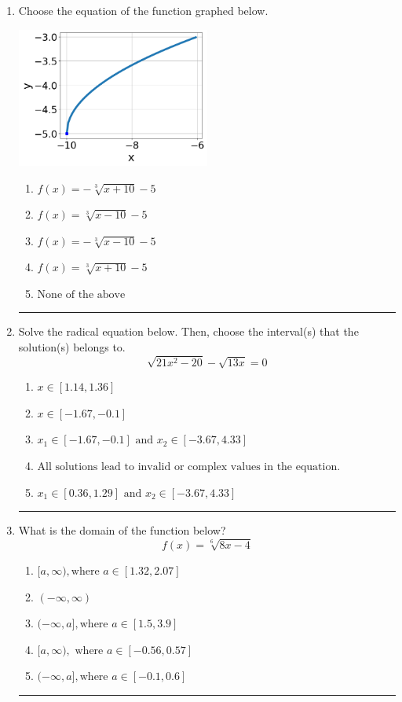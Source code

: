 \documentclass[14pt]{extbook}
\newcommand{\litem}[1]{\item#1\hspace*{-1cm}\rule{\textwidth}{0.4pt}}
\begin{document}
\begin{enumerate}
{\begin{enumerate}[label=\Alph*.]
\end{enumerate} }
\litem{
Choose the equation of the function graphed below.
\begin{center}
    \includegraphics[width=0.5\textwidth]{../Figures/radicalGraphToEquationCopyB.png}
\end{center}
\begin{enumerate}[label=\Alph*.]
\item \( f(x) = - \sqrt[3]{x + 10} - 5 \)
\item \( f(x) = \sqrt[3]{x - 10} - 5 \)
\item \( f(x) = - \sqrt[3]{x - 10} - 5 \)
\item \( f(x) = \sqrt[3]{x + 10} - 5 \)
\item \( \text{None of the above} \)

\end{enumerate} }
\litem{
Solve the radical equation below. Then, choose the interval(s) that the solution(s) belongs to.\[ \sqrt{21 x^2 - 20} - \sqrt{13 x} = 0 \]\begin{enumerate}[label=\Alph*.]
\item \( x \in [1.14,1.36] \)
\item \( x \in [-1.67,-0.1] \)
\item \( x_1 \in [-1.67, -0.1] \text{ and } x_2 \in [-3.67,4.33] \)
\item \( \text{All solutions lead to invalid or complex values in the equation.} \)
\item \( x_1 \in [0.36, 1.29] \text{ and } x_2 \in [-3.67,4.33] \)

\end{enumerate} }
\litem{
What is the domain of the function below?\[ f(x) = \sqrt[6]{8 x - 4} \]\begin{enumerate}[label=\Alph*.]
\item \( [a, \infty), \text{where } a \in [1.32, 2.07] \)
\item \( (-\infty, \infty) \)
\item \( (-\infty, a], \text{where } a \in [1.5, 3.9] \)
\item \( [a, \infty), \text{ where } a \in [-0.56, 0.57] \)
\item \( (-\infty, a], \text{where } a \in [-0.1, 0.6] \)

\end{enumerate} }
\end{enumerate}
\end{document}

